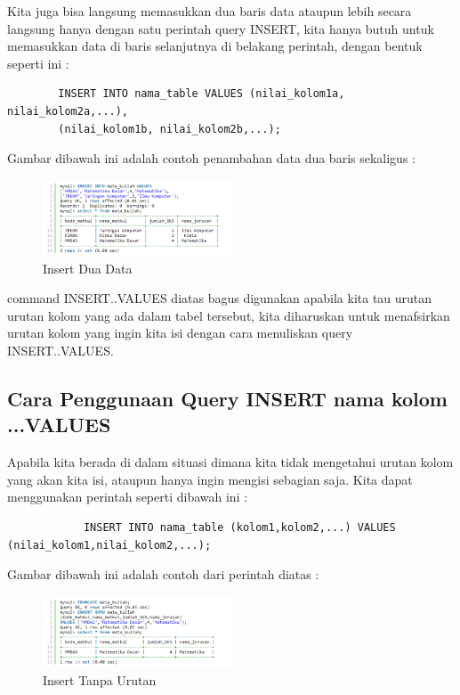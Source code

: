 	Kita juga bisa langsung memasukkan dua baris data ataupun lebih secara langsung hanya dengan satu perintah query INSERT, kita hanya butuh untuk memasukkan data di baris selanjutnya di belakang perintah, dengan bentuk seperti ini :
	
	\begin{verbatim}
		INSERT INTO nama_table VALUES (nilai_kolom1a, nilai_kolom2a,...), 
		(nilai_kolom1b, nilai_kolom2b,...);
	\end{verbatim}
	
	Gambar dibawah ini adalah contoh penambahan data dua baris sekaligus :
	
	\begin{figure}[ht]
			\centerline{\includegraphics[width=0.5\textwidth]{figures/insert2.png}}
			\caption{Insert Dua Data}
			\label{insert2}
			\end{figure}
	
	command INSERT..VALUES diatas bagus digunakan apabila kita tau urutan urutan kolom yang ada dalam tabel tersebut, kita diharuskan untuk menafsirkan urutan kolom yang ingin kita isi dengan cara menuliskan query INSERT..VALUES.
	
	\subsection{Cara Penggunaan Query INSERT nama kolom ...VALUES}
	Apabila kita berada di dalam situasi dimana kita tidak mengetahui urutan kolom yang akan kita isi, ataupun hanya ingin mengisi sebagian saja. Kita dapat menggunakan perintah seperti dibawah ini :
		\begin{verbatim}
			INSERT INTO nama_table (kolom1,kolom2,...) VALUES (nilai_kolom1,nilai_kolom2,...);
		\end{verbatim}
		
	Gambar dibawah ini adalah contoh dari perintah diatas :
	
		\begin{figure}[ht]
			\centerline{\includegraphics[width=0.5\textwidth]{figures/insert3.png}}
			\caption{Insert Tanpa Urutan}
			\label{insert3}
			\end{figure}
			
